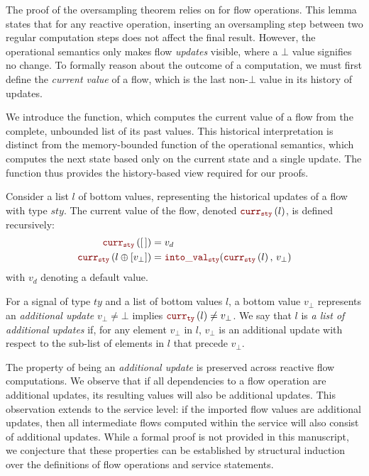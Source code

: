 The proof of the oversampling theorem relies on 
for flow operations. This lemma states that for any reactive operation, inserting an oversampling
step between two regular computation steps does not affect the final result. However, the 
operational semantics only makes flow \emph{updates} visible, where a $\bot$ value signifies no 
change. To formally reason about the outcome of a computation, we must first define the
\emph{current value} of a flow, which is the last non-$\bot$ value in its history of updates.

\newcommand{\CurrVal}[2]{\ensuremath{\smf{curr_{#1}}\left(#2\right)}}
We introduce the  function, which computes the current value of a flow from
the complete, unbounded list of its past values. This historical interpretation is distinct from the
memory-bounded  function of the operational semantics, which computes the next
state based only on the current state and a single update. The  function thus provides the
history-based view required for our proofs.

\begin{definition}
    \label{def:semantics:grfrp:theorems:oversampling:CurrVal}
    Consider a list $l$ of bottom values, representing the historical updates of a flow with type
    $sty$. The current value of the flow, denoted \CurrVal{sty}{l}, is defined recursively:
    \begin{align}
        \CurrVal{sty}{\emptylist}            & = v_d \label{eq:semantics:grfrp:theorems:oversampling:CurrVal:nil}                                      \\
        \CurrVal{sty}{l \lstconcat [v_\bot]} & = \intoVal{sty}{\CurrVal{sty}{l}}{v_\bot} \label{eq:semantics:grfrp:theorems:oversampling:CurrVal:cons}
    \end{align}
    with $v_d$ denoting a default value.

    For a signal of type $ty$ and a list of bottom values $l$, a bottom value $v_\bot$ represents an
    \emph{additional update} \iff $v_\bot \neq \bot$ implies $\CurrVal{ty}{l} \neq v_\bot$. We say
    that $l$ is \emph{a list of additional updates} if, for any element $v_\bot$ in $l$, $v_\bot$ is
    an additional update with respect to the sub-list of elements in $l$ that precede $v_\bot$.
\end{definition}

\begin{remark}
    The property of being an \emph{additional update} is preserved across reactive flow
    computations. We observe that if all dependencies to a flow operation are additional updates,
    its resulting values will also be additional updates.
    This observation extends to the service level: if the imported flow values are additional
    updates, then all intermediate flows computed within the service will also consist of additional
    updates.
    While a formal proof is not provided in this manuscript, we conjecture that these properties can
    be established by structural induction over the definitions of flow operations and service
    statements.
\end{remark}

